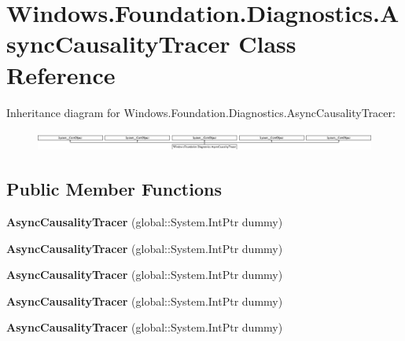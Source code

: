 \hypertarget{class_windows_1_1_foundation_1_1_diagnostics_1_1_async_causality_tracer}{}\section{Windows.\+Foundation.\+Diagnostics.\+Async\+Causality\+Tracer Class Reference}
\label{class_windows_1_1_foundation_1_1_diagnostics_1_1_async_causality_tracer}
Inheritance diagram for Windows.\+Foundation.\+Diagnostics.\+Async\+Causality\+Tracer\+:\begin{figure}[H]
\begin{center}
\leavevmode
\includegraphics[height=0.666667cm]{class_windows_1_1_foundation_1_1_diagnostics_1_1_async_causality_tracer}
\end{center}
\end{figure}
\subsection*{Public Member Functions}
\begin{DoxyCompactItemize}
\item 
\mbox{\label{class_windows_1_1_foundation_1_1_diagnostics_1_1_async_causality_tracer_a74ee1b2a039bf18e4818d25c52a309d4}} 
{\bfseries Async\+Causality\+Tracer} (global\+::\+System.\+Int\+Ptr dummy)
\item 
\mbox{\label{class_windows_1_1_foundation_1_1_diagnostics_1_1_async_causality_tracer_a74ee1b2a039bf18e4818d25c52a309d4}} 
{\bfseries Async\+Causality\+Tracer} (global\+::\+System.\+Int\+Ptr dummy)
\item 
\mbox{\label{class_windows_1_1_foundation_1_1_diagnostics_1_1_async_causality_tracer_a74ee1b2a039bf18e4818d25c52a309d4}} 
{\bfseries Async\+Causality\+Tracer} (global\+::\+System.\+Int\+Ptr dummy)
\item 
\mbox{\label{class_windows_1_1_foundation_1_1_diagnostics_1_1_async_causality_tracer_a74ee1b2a039bf18e4818d25c52a309d4}} 
{\bfseries Async\+Causality\+Tracer} (global\+::\+System.\+Int\+Ptr dummy)
\item 
\mbox{\label{class_windows_1_1_foundation_1_1_diagnostics_1_1_async_causality_tracer_a74ee1b2a039bf18e4818d25c52a309d4}} 
{\bfseries Async\+Causality\+Tracer} (global\+::\+System.\+Int\+Ptr dummy)
\end{DoxyCompactItemize}
